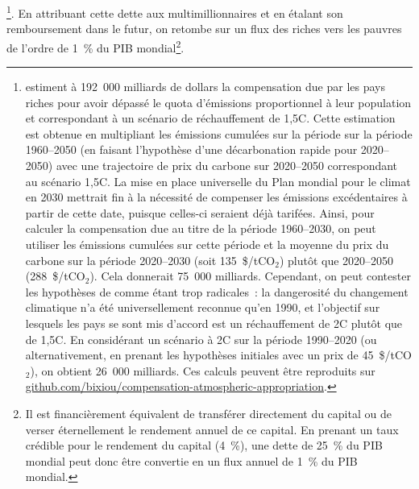 \documentclass[a5paper,french,openany]{memoir}
\begin{document}
\footnote{\cite{fanning_compensation_2023} estiment à 192~000 milliards de dollars la compensation due par les pays riches pour avoir dépassé le quota d'émissions proportionnel à leur population et correspondant à un scénario de réchauffement de 1,5\textdegree{}C. Cette estimation est obtenue en multipliant les émissions cumulées sur la période sur la période 1960--2050 (en faisant l'hypothèse d'une décarbonation rapide pour 2020--2050) %
avec une trajectoire de prix du carbone sur 2020--2050 correspondant au scénario 1,5\textdegree{}C. La mise en place universelle du Plan mondial pour le climat en 2030 mettrait fin à la nécessité de compenser les émissions excédentaires à partir de cette date, puisque celles-ci seraient déjà tarifées. Ainsi, pour calculer la compensation due au titre de la période 1960--2030, on peut utiliser les émissions cumulées sur cette période et la moyenne du prix du carbone sur la période 2020--2030 (soit 135~\$/tCO$_\text{2}$) plutôt que 2020--2050 (288~\$/tCO$_\text{2}$). Cela donnerait 75~000 milliards. Cependant, on peut contester les hypothèses de \cite{fanning_compensation_2023} comme étant trop radicales~: la dangerosité du changement climatique n'a été universellement reconnue qu'en 1990, et l'objectif sur lesquels les pays se sont mis d'accord est un réchauffement de 2\textdegree{}C plutôt que de 1,5\textdegree{}C. En considérant un scénario à 2\textdegree{}C sur la période 1990--2020 (ou alternativement, en prenant les hypothèses initiales avec un prix de 45~\$/tCO$_\text{2}$), on obtient 26~000 milliards. Ces calculs peuvent être reproduits sur \href{https://github.com/bixiou/compensation-atmospheric-appropriation}{github.com/bixiou/compensation-atmospheric-appropriation}.}. 
En attribuant cette dette aux multimillionnaires et en étalant son remboursement dans le futur, on retombe sur un flux des riches vers les pauvres de l'ordre de 1~\% du PIB mondial\footnote{Il est financièrement équivalent de transférer directement du capital ou de verser éternellement le rendement annuel de ce capital. En prenant un taux crédible pour le rendement du capital (4~\%), une dette de 25~\% du PIB mondial peut donc être convertie en un flux annuel de 1~\% du PIB mondial.
}. 
\end{document}
